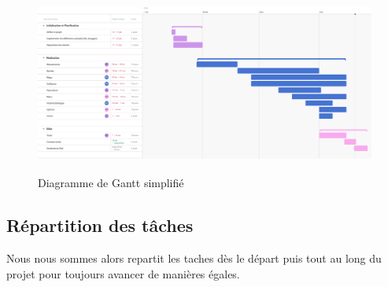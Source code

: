 \documentclass{article}
\begin{document}
\begin{figure}[h]
\centering
\includegraphics[height = 6cm]{ganttSimple.png}
\caption{Diagramme de Gantt simplifié}
\label{fig:gantt_simplifie}
\end{figure}
\newpage



\subsection{Répartition des tâches}

Nous nous sommes alors repartit les taches dès le départ puis tout au long du projet pour toujours avancer de manières égales.
\end{document}
